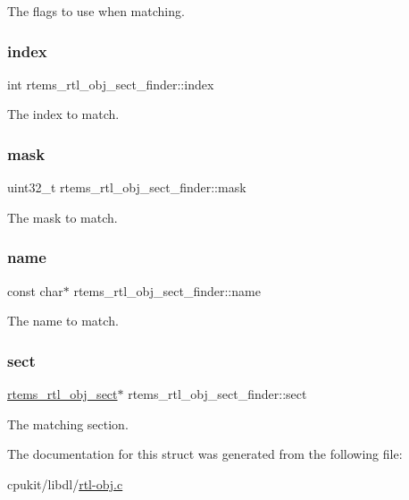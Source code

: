 The flags to use when matching. \mbox{\label{structrtems__rtl__obj__sect__finder_a229f0aa5c51b4dc979bee90a914fd168}} 
\subsubsection{\texorpdfstring{index}{index}}
{\footnotesize\ttfamily int rtems\+\_\+rtl\+\_\+obj\+\_\+sect\+\_\+finder\+::index}

The index to match. \mbox{\label{structrtems__rtl__obj__sect__finder_aec20264a6cb7b9141128153c5ffee858}} 
\subsubsection{\texorpdfstring{mask}{mask}}
{\footnotesize\ttfamily uint32\+\_\+t rtems\+\_\+rtl\+\_\+obj\+\_\+sect\+\_\+finder\+::mask}

The mask to match. \mbox{\label{structrtems__rtl__obj__sect__finder_a6c4c7350a7156f3280c2810bd88a79b1}} 
\subsubsection{\texorpdfstring{name}{name}}
{\footnotesize\ttfamily const char$\ast$ rtems\+\_\+rtl\+\_\+obj\+\_\+sect\+\_\+finder\+::name}

The name to match. \mbox{\label{structrtems__rtl__obj__sect__finder_a7d2b572e1a5d0f044abea6560c149c7f}} 
\subsubsection{\texorpdfstring{sect}{sect}}
{\footnotesize\ttfamily \mbox{\hyperlink{structrtems__rtl__obj__sect}{rtems\+\_\+rtl\+\_\+obj\+\_\+sect}}$\ast$ rtems\+\_\+rtl\+\_\+obj\+\_\+sect\+\_\+finder\+::sect}

The matching section. 

The documentation for this struct was generated from the following file\+:\begin{DoxyCompactItemize}
\item 
cpukit/libdl/\mbox{\hyperlink{rtl-obj_8c}{rtl-\/obj.\+c}}\end{DoxyCompactItemize}
